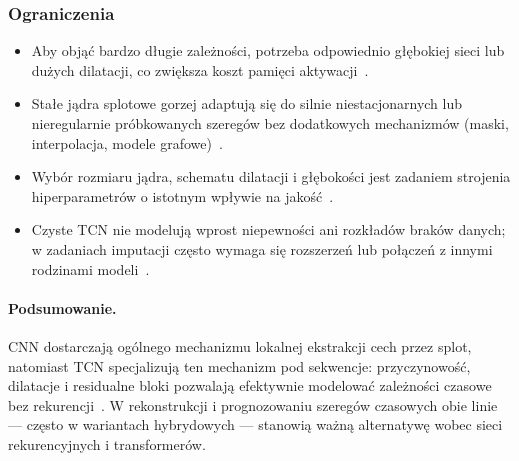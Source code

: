 \subsubsection{Ograniczenia}
\begin{itemize}
  \item Aby objąć bardzo długie zależności, potrzeba odpowiednio głębokiej sieci
        lub dużych dilatacji, co zwiększa koszt pamięci aktywacji~\citep{bai2018empirical}.
  \item Stałe jądra splotowe gorzej adaptują się do silnie niestacjonarnych
        lub nieregularnie próbkowanych szeregów bez dodatkowych mechanizmów
        (maski, interpolacja, modele grafowe)~\citep{chen2024bitgraph}.
  \item Wybór rozmiaru jądra, schematu dilatacji i głębokości jest zadaniem
        strojenia hiperparametrów o istotnym wpływie na jakość~\citep{bai2018empirical}.
  \item Czyste TCN nie modelują wprost niepewności ani rozkładów braków danych;
        w zadaniach imputacji często wymaga się rozszerzeń lub połączeń
        z innymi rodzinami modeli~\citep{hussain2022cnnlstm,chen2024bitgraph}.
\end{itemize}

\paragraph{Podsumowanie.}
CNN dostarczają ogólnego mechanizmu lokalnej ekstrakcji cech przez splot,
natomiast TCN specjalizują ten mechanizm pod sekwencje: przyczynowość, dilatacje
i residualne bloki pozwalają efektywnie modelować zależności czasowe bez
rekurencji~\citep{lecun2015deep,bai2018empirical}. W rekonstrukcji i prognozowaniu
szeregów czasowych obie linie --- często w wariantach hybrydowych --- stanowią
ważną alternatywę wobec sieci rekurencyjnych i transformerów.
